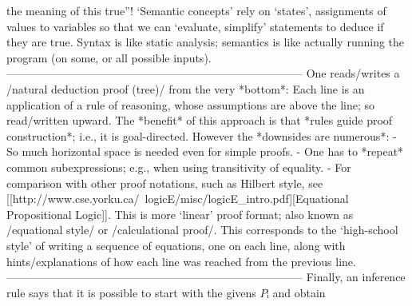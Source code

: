 \documentclass[11pt]{article}
\begin{document}
the meaning of this true”! \quad ‘Semantic concepts’ rely on ‘states’, assignments of values to variables so that we can ‘evaluate, simplify’ statements to deduce if they are true.  Syntax is like static analysis; semantics is like actually running the program (on some, or all possible inputs).  --------------------------------------------------------------------------------  One reads/writes a /natural deduction proof (tree)/ from the very *bottom*: Each line is an application of a rule of reasoning, whose assumptions are above the line; so read/written upward. \quad The *benefit* of this approach is that *rules guide proof construction*; i.e., it is goal-directed.  However the *downsides are numerous*: - So much horizontal space is needed even for simple proofs. - One has to *repeat* common subexpressions; e.g., when using transitivity of equality. - For comparison with other proof notations, such as Hilbert style,  \quad see [[http://www.cse.yorku.ca/~logicE/misc/logicE_intro.pdf][Equational Propositional Logic]].   \quad This is more ‘linear’ proof format; also known as /equational style/ or  \quad /calculational proof/. This corresponds to the ‘high-school style’ of writing a  \quad sequence of equations, one on each line, along with hints/explanations of how  \quad each line was reached from the previous line.  --------------------------------------------------------------------------------  Finally, an inference rule says that it is possible to start with the givens $Pᵢ$ and obtain 
\end{document}
